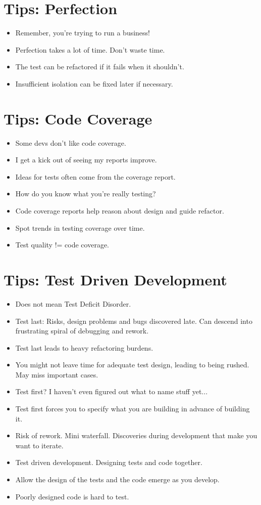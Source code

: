 \documentclass{article}
\begin{document}
\newpage
\section{Tips: Perfection}
\begin{itemize}
    \item Remember, you're trying to run a business!
    \item Perfection takes a lot of time. Don't waste time.
    \item The test can be refactored if it fails when it shouldn't.
    \item Insufficient isolation can be fixed later if necessary.
\end{itemize}

\newpage
\section{Tips: Code Coverage}
\begin{itemize}
    \item Some devs don't like code coverage.
    \item I get a kick out of seeing my reports improve.
    \item Ideas for tests often come from the coverage report.
    \item How do you know what you're really testing?
    \item Code coverage reports help reason about design and guide refactor.
    \item Spot trends in testing coverage over time.
    \item Test quality != code coverage.
\end{itemize}

\newpage
\section{Tips: Test Driven Development}
\begin{itemize}
    \item Does not mean Test Deficit Disorder.
    \item Test last: Risks, design problems and bugs discovered late. Can
        descend into frustrating spiral of debugging and rework.
    \item Test last leads to heavy refactoring burdens.
    \item You might not leave time for adequate test design, leading to being
        rushed. May miss important cases.
    \item Test first? I haven't even figured out what to name stuff yet...
    \item Test first forces you to specify what you are building in advance
        of building it.
    \item Risk of rework. Mini waterfall. Discoveries during development that
        make you want to iterate.
    \item Test driven development. Designing tests and code together.
    \item Allow the design of the tests and the code emerge as you develop.
    \item Poorly designed code is hard to test.
\end{itemize}
\end{document}
